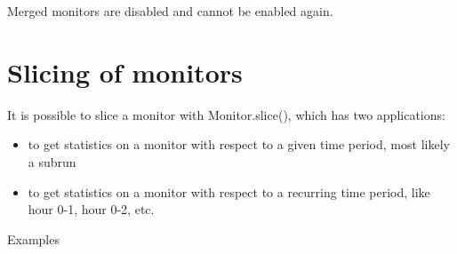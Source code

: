 \documentclass[letterpaper,10pt,english]{sphinxmanual}
\begin{document}
\begin{sphinxVerbatim}[commandchars=\\\{\}]
  
\end{sphinxVerbatim}

Merged monitors are disabled and cannot be enabled again.


\section{Slicing of monitors}
\label{\detokenize{Monitor:slicing-of-monitors}}
It is possible to slice a monitor with Monitor.slice(), which has two applications:
\begin{itemize}
\item {} 
to get statistics on a monitor with respect to a given time period, most likely a subrun

\item {} 
to get statistics on a monitor with respect to a recurring time period, like hour 0-1, hour 0-2, etc.

\end{itemize}

Examples
\end{document}
